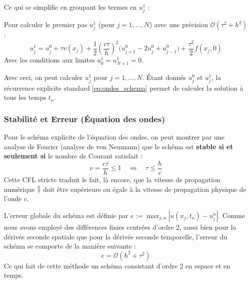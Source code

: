 Ce qui se simplifie en groupant les termes en $u_j^1$ :
\begin{algorithme}
Pour calculer le premier pas $u_j^1$ (pour $j=1, \dots, N$) avec une précision $\mathcal{O}(\tau^2 + h^2)$ :
\begin{equation*}
u_j^1 = u_j^0 + \tau v(x_j) + \frac{1}{2}\left(\frac{c\tau}{h}\right)^2 \Big( u_{j+1}^0 - 2u_j^0 + u_{j-1}^0 \Big) + \frac{\tau^2}{2} f(x_j, 0)
\end{equation*}
Avec les conditions aux limites $u_0^1 = u_{N+1}^1 = 0$.
\end{algorithme}

Avec ceci, on peut calculer $u_j^1$ pour $j=1, \dots, N$. Étant donnés $u_j^0$ et $u_j^1$, la récurrence explicite standard \eqref{eq:ondes_schema} permet de calculer la solution à tous les temps $t_n$.

\subsubsection{Stabilité et Erreur (Équation des ondes)}

\begin{remarque}
Pour le schéma explicite de l'équation des ondes, on peut montrer par une analyse de Fourier (analyse de von Neumann) que le schéma est \textbf{stable si et seulement si} le nombre de Courant satisfait :
\begin{equation*}
\nu = \frac{c \tau}{h} \le 1 \quad \iff \quad \tau \le \frac{h}{c}
\end{equation*}
Cette CFL stricte traduit le fait, là encore, que la vitesse de propagation numérique $\frac{h}{\tau}$ doit être supérieure ou égale à la vitesse de propagation physique de l'onde $c$.
\end{remarque}

\begin{explication}
L'erreur globale du schéma est définie par $e := \max_{j,n} |u(x_j, t_n) - u_j^n|$.
Comme nous avons employé des différences finies centrées d'ordre 2, aussi bien pour la dérivée seconde spatiale que pour la dérivée seconde temporelle, l'erreur du schéma se comporte de la manière suivante :
\begin{equation*}
e = \mathcal{O}(h^2 + \tau^2)
\end{equation*}
Ce qui fait de cette méthode un schéma consistant d'ordre 2 en espace et en temps.
\end{explication}
